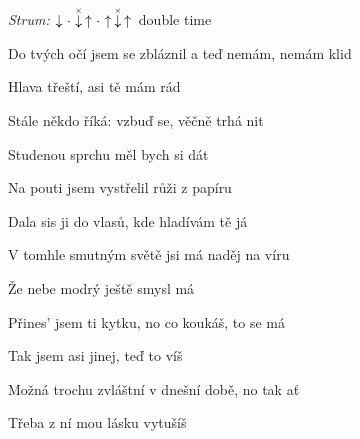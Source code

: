 \begin{song}


\begin{headerbox}
\RaiseBoxWithAccents
\textit{Strum:} $\Down\Miss\ChuckDown\Up\Miss\Up\ChuckDown\Up$ double time
\end{headerbox}

\begin{hchordbox}
\end{hchordbox}

\Large

\bigskip

Do tvých očí jsem se zbláznil a teď nemám, nemám klid \par
{} Hlava třeští, asi tě mám rád \par
{} Stále někdo říká: vzbuď se, věčně trhá nit \par
{} Studenou sprchu měl bych si dát \par

\bigskip

\begin{chorusbox}{\Refren}
 Na pouti jsem vystřelil růži z papíru \par
{} Dala sis ji do vlasů, kde hladívám tě já \par
{} V tomhle smutným světě jsi má naděj na víru \par
Že nebe modrý ještě smysl má \par
\end{chorusbox}

\bigskip

 Přines' jsem ti kytku, no co koukáš, to se má \par
{} Tak jsem asi jinej, teď to víš \par
{} Možná trochu zvláštní v dnešní době, no tak ať \par
{} Třeba z ní mou lásku vytušíš \par

\bigskip

\Refren {}

\end{song}
